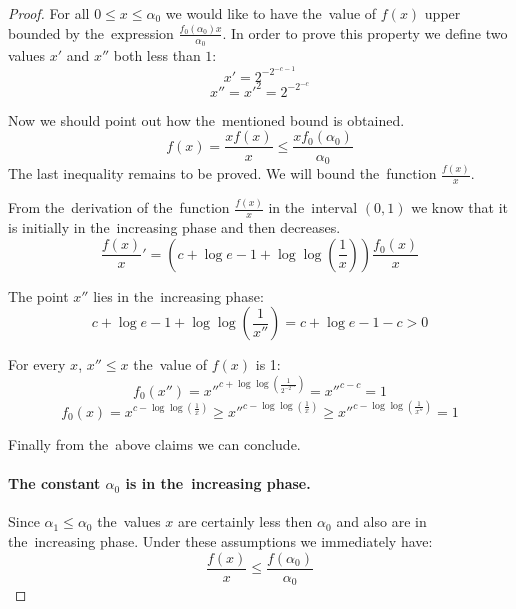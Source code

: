 \begin{proof}
For all $0 \leq x \leq \alpha_0$ we would like to have the~value of $f(x)$ upper bounded by the~expression $\frac{f_0(\alpha_0)x}{\alpha_0}$. In order to prove this property we define two values $x'$ and $x''$ both less than $1$:
\begin{equation}
x' = 2 ^ {-2 ^ {-c - 1}}
\end{equation}
\begin{equation}
x'' = {x'}^2 = 2 ^ {-2 ^ {-c}}
\end{equation}

Now we should point out how the~mentioned bound is obtained.
\begin{equation}
f(x) = \frac{x f(x)}{x} \leq \frac{x f_0(\alpha_0)}{\alpha_0}
\end{equation}
The last inequality remains to be proved. We will bound the~function $\frac{f(x)}{x}$. 

From the~derivation of the~function $\frac{f(x)}{x}$ in the~interval $(0, 1)$ we know that it is initially in the~increasing phase and then decreases.
\begin{displaymath}
\frac{f(x)}{x}' = \left(c + \log e - 1 + \log \log \left(\frac{1}{x}\right)\right)\frac{f_0(x)}{x}
\end{displaymath}

The point $x''$ lies in the~increasing phase:
\begin{displaymath}
c + \log e - 1 + \log \log \left(\frac{1}{x''}\right) = c + \log e - 1 - c > 0
\end{displaymath}

For every $x$, $x'' \leq x$ the~value of $f(x)$ is 1:
\begin{equation}\label{f-x-double-prime}
f_0(x'') = {x''}^{c + \log \log \left(\frac{1}{2^{-2^{-c}}}\right)} = {x''}^{c - c} = 1
\end{equation}
\begin{equation}\label{f-x-after-double-prime}
f_0(x) = x^{c - \log \log \left(\frac{1}{x}\right)} \geq {x''}^{c - \log \log \left(\frac{1}{x}\right)} \geq {x''}^{c - \log \log \left(\frac{1}{x''}\right)} = 1
\end{equation}

Finally from the~above claims we can conclude.
\paragraph{The constant $\alpha_0$ is in the~increasing phase.}
Since $\alpha_1 \leq \alpha_0$ the~values $x$ are certainly less then $\alpha_0$ and also are in the~increasing phase. Under these assumptions we immediately have:
\begin{equation}
\frac{f(x)}{x} \leq \frac{f(\alpha_0)}{\alpha_0}
\end{equation}


\end{proof}
